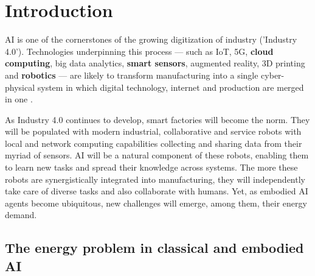 \section{Introduction}\label{sec:intro}
\begin{fancyquotes}
	AI is one of the cornerstones of the growing digitization of industry ('Industry 4.0'). Technologies underpinning  this  process  ---  such as IoT,  5G,  \textbf{cloud  computing},  big  data  analytics,  \textbf{smart  sensors},  augmented  reality,  3D  printing  and  \textbf{robotics}  ---  are  likely  to  transform  manufacturing  into  a  single cyber-physical  system  in which digital  technology,  internet  and  production  are merged in one \cite{szczepanski_2019}.
\end{fancyquotes}
As Industry 4.0 continues to develop, smart factories will become the norm. They will be populated with modern industrial, collaborative and service robots with local and network computing capabilities collecting and sharing data from their myriad of sensors. %
AI will be a natural component of these robots, enabling them to learn new tasks and spread their knowledge across systems. The more these robots are synergistically integrated into manufacturing, they will independently take care of diverse tasks and also collaborate with humans. Yet, as embodied AI agents become ubiquitous, new challenges will emerge, among them, their energy demand.

\subsection{The energy problem in classical and embodied AI}

